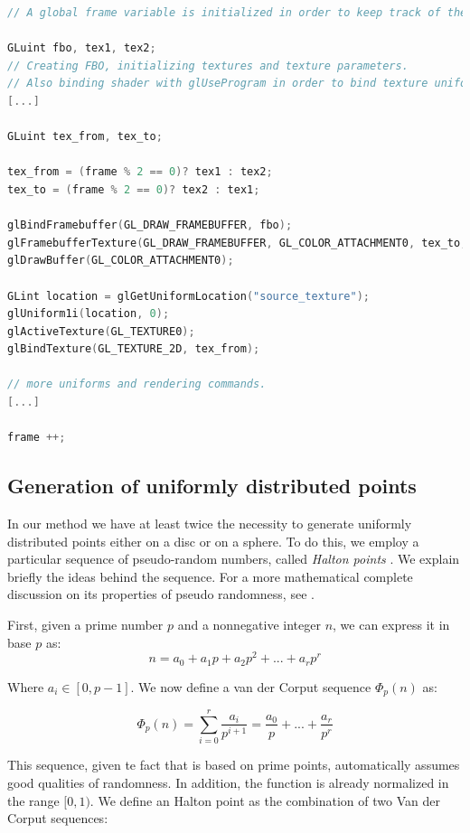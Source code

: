 \begin{lstlisting}[language=C++,label=lst:pingpong,caption={Minimal example of ping-pong textures.}]
// A global frame variable is initialized in order to keep track of the current frame

GLuint fbo, tex1, tex2;
// Creating FBO, initializing textures and texture parameters.
// Also binding shader with glUseProgram in order to bind texture uniforms
[...]

GLuint tex_from, tex_to;

tex_from = (frame % 2 == 0)? tex1 : tex2;
tex_to = (frame % 2 == 0)? tex2 : tex1;

glBindFramebuffer(GL_DRAW_FRAMEBUFFER, fbo);
glFramebufferTexture(GL_DRAW_FRAMEBUFFER, GL_COLOR_ATTACHMENT0, tex_to, 0);
glDrawBuffer(GL_COLOR_ATTACHMENT0);

GLint location = glGetUniformLocation("source_texture");
glUniform1i(location, 0);
glActiveTexture(GL_TEXTURE0);
glBindTexture(GL_TEXTURE_2D, tex_from);

// more uniforms and rendering commands.
[...]

frame ++;
\end{lstlisting}

\subsection{Generation of uniformly distributed points}
\label{sec:random}
In our method we have at least twice the necessity to generate uniformly distributed points either on a disc or on a sphere. To do this, we employ a particular sequence of pseudo-random numbers, called \emph{Halton points} \citep{Halton:1964:ARQ:355588.365104}. We explain briefly the ideas behind the sequence. For a more mathematical complete discussion on its properties of pseudo randomness, see \cite{niederreiter1992a}. 

First, given a prime number $p$ and a nonnegative integer $n$, we can express it in base $p$ as:
$$
n = a_0 + {a_1} p + a_2 p^2 + ... + a_r p^r
$$  

Where $a_i \in [0, p - 1]$. We now define a van der Corput sequence $\Phi_p(n)$ as:

$$
\Phi_p(n) = \sum_{i = 0}^r \frac{a_i}{p^{i+1}} = \frac{a_0}{p} + ... + \frac{a_r}{p^r}
$$

This sequence, given te fact that is based on prime points, automatically assumes good qualities of randomness. In addition, the function is already normalized in the range $[0,1)$. We define an Halton point as the combination of two Van der Corput sequences:

